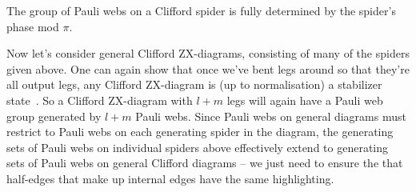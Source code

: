 \begin{remark}\label{rem:pauli_webs_only_care_mod_pi}
    The group of Pauli webs on a Clifford spider is fully determined by the spider's phase mod $\pi$.
\end{remark}

Now let's consider general Clifford ZX-diagrams, consisting of many of the spiders given above.
One can again show that once we've bent legs around so that they're all output legs, any Clifford ZX-diagram is (up to normalisation) a stabilizer state~\cite[Theorem 6.3.18]{KissingerWetering2024Book}.
So a Clifford ZX-diagram with $l+m$ legs will again have a Pauli web group generated by $l+m$ Pauli webs.
Since Pauli webs on general diagrams must restrict to Pauli webs on each generating spider in the diagram, the generating sets of Pauli webs on individual spiders above effectively extend to generating sets of Pauli webs on general Clifford diagrams -- we just need to ensure the that half-edges that make up internal edges have the same highlighting.

